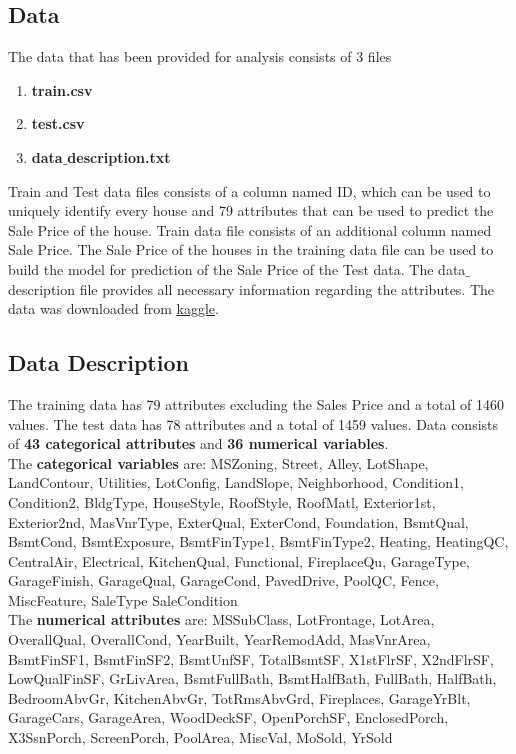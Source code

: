 \documentclass[fleqn,10pt]{SelfArx} %
\begin{document}
\subsection{Data}
The data that has been provided for analysis consists of 3 files
\begin{enumerate}[noitemsep]
\item \textbf{train.csv}
\item \textbf{test.csv}
\item \textbf{data$\_$description.txt}
\end{enumerate}

Train and Test data files consists of a column named ID, which can be used to uniquely identify every house and 79 attributes that can be used to predict the Sale Price of the house. Train data file consists of an additional column named Sale Price. The Sale Price of the houses in the training data file can be used to build the model for prediction of the Sale Price of the Test data. The data$\_$description file provides all necessary information regarding the attributes.
The data was downloaded from 
\href{https://www.kaggle.com/c/house-prices-advanced-regression-techniques/data}{\color{blue}kaggle}.


\subsection{Data Description}
The training data has 79 attributes excluding the Sales Price and a total of 1460 values. The test data has 78 attributes and a total of 1459 values.
Data consists of \textbf{43 categorical attributes} and \textbf{36 numerical variables}. 
\\The \textbf{categorical variables} are: MSZoning, Street, Alley, LotShape, LandContour, Utilities, LotConfig, LandSlope, Neighborhood, Condition1, Condition2, BldgType, HouseStyle, RoofStyle, RoofMatl, Exterior1st, Exterior2nd, MasVnrType, ExterQual, ExterCond, Foundation, BsmtQual, BsmtCond, BsmtExposure, BsmtFinType1, BsmtFinType2, Heating, HeatingQC, CentralAir, Electrical, KitchenQual, Functional, FireplaceQu, GarageType, GarageFinish, GarageQual, GarageCond, PavedDrive, PoolQC, Fence, MiscFeature, SaleType
SaleCondition
\\The \textbf{numerical attributes} are: 
MSSubClass, LotFrontage, LotArea, OverallQual, OverallCond, YearBuilt, YearRemodAdd, MasVnrArea, BsmtFinSF1, BsmtFinSF2, BsmtUnfSF, TotalBsmtSF, X1stFlrSF, X2ndFlrSF, LowQualFinSF, GrLivArea, BsmtFullBath, BsmtHalfBath, FullBath, HalfBath, BedroomAbvGr, KitchenAbvGr, TotRmsAbvGrd, Fireplaces, GarageYrBlt, GarageCars, GarageArea, WoodDeckSF, OpenPorchSF, EnclosedPorch, X3SsnPorch, ScreenPorch, PoolArea, MiscVal, MoSold, YrSold
\end{document}
